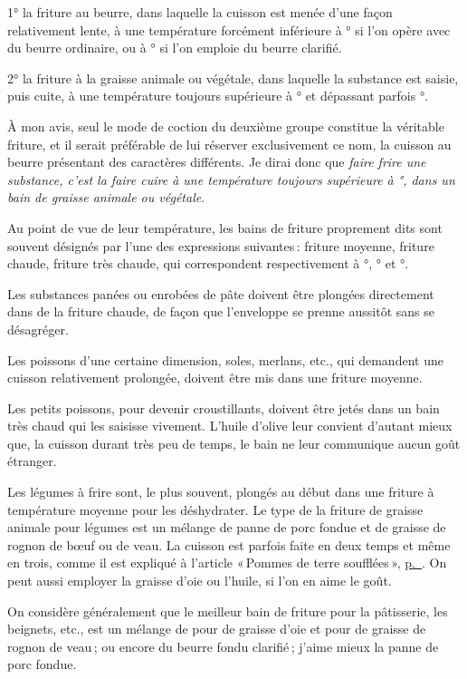 1° la friture au beurre, dans laquelle la cuisson est menée d'une façon
relativement lente, à une température forcément inférieure à {\mmm}° si
l'on opère avec du beurre ordinaire, ou à {\mmm}° si l’on emploie du
beurre clarifié.

2° la friture à la graisse animale ou végétale, dans laquelle la substance est
saisie, puis cuite, à une température toujours supérieure à {\mmm}° et
dépassant parfois {\mmm}°.

À mon avis, seul le mode de coction du deuxième groupe constitue la véritable
friture, et il serait préférable de lui réserver exclusivement ce nom, la
cuisson au beurre présentant des caractères différents. Je dirai donc que
\textit{faire frire une substance, c'est la faire cuire à une température
toujours supérieure à {\mmm}°, dans un bain de graisse animale ou végétale}.

Au point de vue de leur température, les bains de friture proprement dits sont
souvent désignés par l’une des expressions suivantes : friture moyenne, friture
chaude, friture très chaude, qui correspondent respectivement à {\mmm}°,
{\mmm}° et {\mmm}°.

Les substances panées ou enrobées de pâte doivent être plongées directement
dans de la friture chaude, de façon que l'enveloppe se prenne aussitôt sans se
désagréger.

Les poissons d’une certaine dimension, soles, merlans, etc., qui demandent une
cuisson relativement prolongée, doivent être mis dans une friture moyenne.

Les petits poissons, pour devenir croustillants, doivent être jetés dans un
bain très chaud qui les saisisse vivement. L'huile d'olive leur convient
d'autant mieux que, la cuisson durant très peu de temps, le bain ne leur
communique aucun goût étranger.

Les légumes à frire sont, le plus souvent, plongés au début dans une friture
à température moyenne pour les déshydrater. Le type de la friture de graisse
animale pour légumes est un mélange de panne de porc fondue et de graisse de
rognon de bœuf ou de veau. La cuisson est parfois faite en deux temps et même
en trois, comme il est expliqué à l'article « Pommes de terre soufflées »,
\hyperlink{p0715}{p. \pageref{pg0715}}. On peut aussi employer la graisse d'oie ou
l'huile, si l'on en aime le goût.

On considère généralement que le meilleur bain de friture pour la pâtisserie,
les beignets, etc., est un mélange de {\mmm} pour {\mmm} de
graisse d'oie et {\mmm} pour {\mmm} de graisse de rognon de veau ;
ou encore du beurre fondu clarifié ; j'aime mieux la panne de porc fondue.

